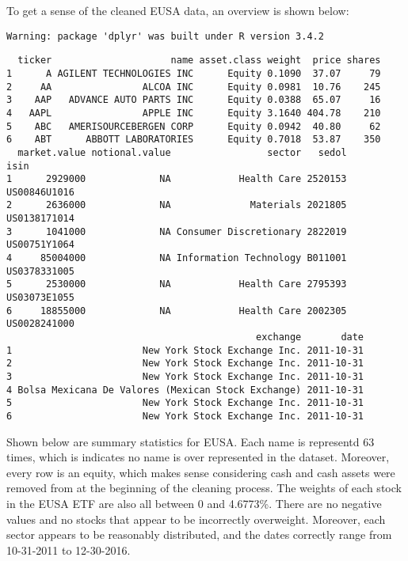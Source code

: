 \documentclass[12pt,twoside]{reedthesis}
\theoremstyle{definition}
\theoremstyle{definition}
\theoremstyle{definition}
\theoremstyle{remark}
\begin{document}
To get a sense of the cleaned EUSA data, an overview is shown below:
\begin{verbatim}
Warning: package 'dplyr' was built under R version 3.4.2
\end{verbatim}
\begin{verbatim}
  ticker                     name asset.class weight  price shares
1      A AGILENT TECHNOLOGIES INC      Equity 0.1090  37.07     79
2     AA                ALCOA INC      Equity 0.0981  10.76    245
3    AAP   ADVANCE AUTO PARTS INC      Equity 0.0388  65.07     16
4   AAPL                APPLE INC      Equity 3.1640 404.78    210
5    ABC   AMERISOURCEBERGEN CORP      Equity 0.0942  40.80     62
6    ABT      ABBOTT LABORATORIES      Equity 0.7018  53.87    350
  market.value notional.value                 sector   sedol         isin
1      2929000             NA            Health Care 2520153 US00846U1016
2      2636000             NA              Materials 2021805 US0138171014
3      1041000             NA Consumer Discretionary 2822019 US00751Y1064
4     85004000             NA Information Technology B011001 US0378331005
5      2530000             NA            Health Care 2795393 US03073E1055
6     18855000             NA            Health Care 2002305 US0028241000
                                            exchange       date
1                       New York Stock Exchange Inc. 2011-10-31
2                       New York Stock Exchange Inc. 2011-10-31
3                       New York Stock Exchange Inc. 2011-10-31
4 Bolsa Mexicana De Valores (Mexican Stock Exchange) 2011-10-31
5                       New York Stock Exchange Inc. 2011-10-31
6                       New York Stock Exchange Inc. 2011-10-31
\end{verbatim}
Shown below are summary statistics for EUSA. Each name is representd 63
times, which is indicates no name is over represented in the dataset.
Moreover, every row is an equity, which makes sense considering cash and
cash assets were removed from at the beginning of the cleaning process.
The weights of each stock in the EUSA ETF are also all between 0 and
4.6773\%. There are no negative values and no stocks that appear to be
incorrectly overweight. Moreover, each sector appears to be reasonably
distributed, and the dates correctly range from 10-31-2011 to
12-30-2016.
\end{document}
